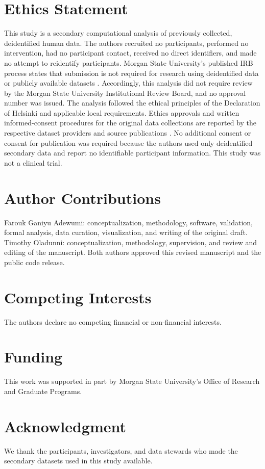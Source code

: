 \documentclass[12pt]{article}
\let\cite\citep
\begin{document}
\section*{Ethics Statement}
This study is a secondary computational analysis of previously collected, deidentified human data. The authors recruited no participants, performed no intervention, had no participant contact, received no direct identifiers, and made no attempt to reidentify participants. Morgan State University's published IRB process states that submission is not required for research using deidentified data or publicly available datasets \cite{morganIRB2023}. Accordingly, this analysis did not require review by the Morgan State University Institutional Review Board, and no approval number was issued. The analysis followed the ethical principles of the Declaration of Helsinki and applicable local requirements. Ethics approvals and written informed-consent procedures for the original data collections are reported by the respective dataset providers and source publications \cite{aurorabp2022,aurorabpDataset,pimentel2017,appel2025ppg,lee2022vitaldb,vitaldbDataset}. No additional consent or consent for publication was required because the authors used only deidentified secondary data and report no identifiable participant information. This study was not a clinical trial.
\section*{Author Contributions}
Farouk Ganiyu Adewumi: conceptualization, methodology, software, validation, formal analysis, data curation, visualization, and writing of the original draft. Timothy Oladunni: conceptualization, methodology, supervision, and review and editing of the manuscript. Both authors approved this revised manuscript and the public code release.
\section*{Competing Interests}
The authors declare no competing financial or non-financial interests.
\section*{Funding}
This work was supported in part by Morgan State University's Office of Research and Graduate Programs.
\section*{Acknowledgment}
We thank the participants, investigators, and data stewards who made the secondary datasets used in this study available.


\end{document}

